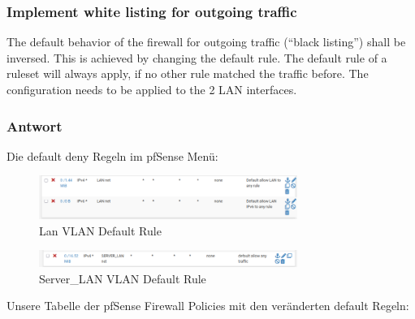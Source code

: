 \documentclass{article}
\begin{document}
\subsubsection{Implement white listing for outgoing traffic}

The default behavior of the firewall for outgoing traffic (“black listing”) shall be 
inversed. This is achieved by changing the default rule. The default rule of a 
ruleset will always apply, if no other rule matched the traffic before. The 
configuration needs to be applied to the 2 LAN interfaces. 

\subsubsection*{Antwort}

Die default deny Regeln im pfSense Menü:

\begin{figure}[H]
	\includegraphics[width=0.75\textwidth]{images/03}
	\centering
	\caption{Lan VLAN Default Rule}
\end{figure}

\begin{figure}[H]
	\includegraphics[width=0.75\textwidth]{images/04}
	\centering
	\caption{Server\_LAN VLAN Default Rule}
\end{figure}

Unsere Tabelle der pfSense Firewall Policies mit den veränderten default Regeln:

\begin{center}
\end{center}
\end{document}
